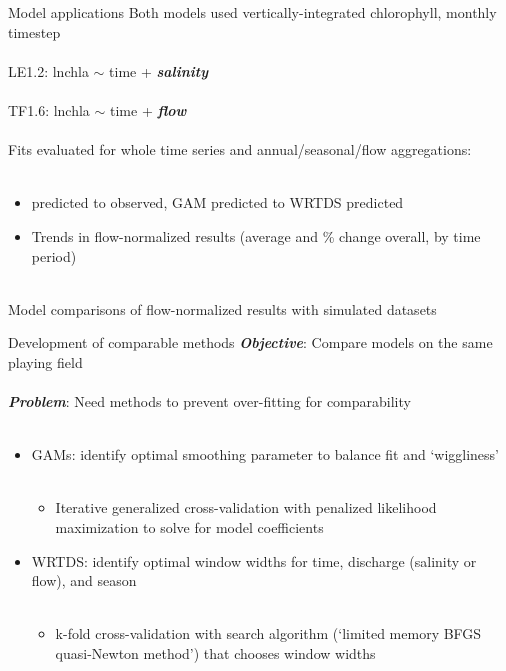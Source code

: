 \documentclass[serif]{beamer}\usepackage[]{graphicx}\usepackage[]{color}
\newcommand{\Bigtxt}[1]{\textbf{\textit{#1}}}
\begin{document}
\begin{frame}{Model applications}
Both models used vertically-integrated chlorophyll, monthly timestep \\~\\
LE1.2: lnchla $\sim$ time + \Bigtxt{salinity} \\~\\
TF1.6: lnchla $\sim$ time + \Bigtxt{flow} \\~\\
Fits evaluated for whole time series and annual/seasonal/flow aggregations: \\~\\
\begin{itemize}
\item predicted to observed, GAM predicted to WRTDS predicted
\item Trends in flow-normalized results (average and \% change overall, by time period) \\~\\
\end{itemize}
Model comparisons of flow-normalized results with simulated datasets
\end{frame}

\begin{frame}{Development of comparable methods}
\Bigtxt{Objective}: Compare models on the same playing field \\~\\
\Bigtxt{Problem}: Need methods to prevent over-fitting for comparability \\~\\
\begin{itemize}
\item GAMs: identify optimal smoothing parameter to balance fit and `wiggliness' \\~\\
\begin{itemize}
\item Iterative generalized cross-validation with penalized likelihood maximization to solve for model coefficients 
\end{itemize}
\end{itemize}
\begin{itemize}
\item WRTDS: identify optimal window widths for time, discharge (salinity or flow), and season \\~\\
\begin{itemize}
\item k-fold cross-validation with search algorithm (`limited memory BFGS quasi-Newton method') that chooses window widths
\end{itemize}
\end{itemize}
\end{frame}
\end{document}
